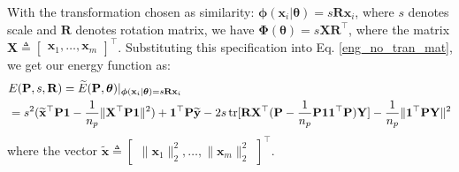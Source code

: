 \documentclass[11pt,bezier,]{article}
\begin{document}
With the  transformation chosen as similarity:
 $\boldsymbol\phi(\mathbf x_i|\boldsymbol\theta)=s\mathbf R \mathbf x_i$,
where   $s$ denotes scale and $\mathbf R$ denotes   rotation matrix,
we have
$\mathbf\Phi(\boldsymbol\theta)=s \mathbf X \mathbf R^\top$,
where the matrix $\mathbf X\triangleq \begin{bmatrix}
    \mathbf x_1,\ldots,\mathbf x_m
   \end{bmatrix}^\top$.
Substituting this specification  into Eq. \eqref{eng_no_tran_mat},
we get our energy function as:
\begin{align}
& E(\mathbf P,s,\mathbf R)= \widetilde E(\mathbf P,\boldsymbol\theta)|_{\boldsymbol\phi(\mathbf x_i|\boldsymbol\theta)=s\mathbf R\mathbf x_i}  \notag\\
& = s^2 (\mathbf {\widetilde x}^\top\mathbf P\mathbf  1   - \frac{1}{n_p}    \| \mathbf X^\top\mathbf P\mathbf  1\|^2)  
 +\mathbf 1^\top\mathbf P \mathbf {\widetilde y} 
- 2s\,\text{tr} [ \mathbf R  \mathbf X^\top(\mathbf P - \frac{1}{n_p}\mathbf P\mathbf 1 \mathbf 1^\top\mathbf P) \mathbf Y]
 - \frac{1}{n_p} \|\mathbf  1^\top\mathbf P \mathbf Y\|^2
\end{align}
where the vector $\mathbf {\widetilde x}\triangleq \begin{bmatrix}
   \|\mathbf x_1\|_2^2, \dots, \|\mathbf x_{m}\|_2^2
  \end{bmatrix}^\top$.
\end{document}
